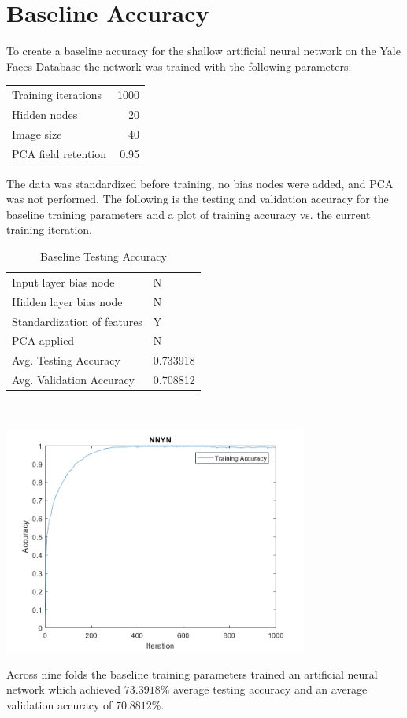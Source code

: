 \documentclass[12pt]{article}
\newcommand{\testingValidationAccuracyTable}[7] {
  \begin{tabular}{l|l}
    \hline
    Input layer bias node & #1 \\
    Hidden layer bias node & #2 \\
    Standardization of features & #3 \\
    PCA applied & #4 \\
    \hline
    Avg. Testing Accuracy & #5 \\
    Avg. Validation Accuracy & #6 \\
    \hline
  \end{tabular}
  ~\\[60pt]
  \caption{#7}
}
\begin{document}
\section{Baseline Accuracy}
To create a baseline accuracy for the shallow artificial neural network on the Yale Faces Database the network was trained with the following parameters:
\begin{center}
  \begin{tabular}{l|r}
    \hline
    Training iterations & 1000 \\
    Hidden nodes & 20 \\
    Image size & 40 \\
    PCA field retention & 0.95 \\
    \hline
  \end{tabular}
\end{center}
\bigskip

The data was standardized before training, no bias nodes were added, and PCA was not performed. The following is the testing and validation accuracy for the baseline training parameters and a plot of training accuracy vs. the current training iteration.\\
\begin{center}
  \begin{table}[H]
    \begin{varwidth}[b]{0.4\linewidth}
      \centering
      \testingValidationAccuracyTable{N}{N}{Y}{N}{0.733918}{0.708812}{Baseline Testing Accuracy}
      \label{table:baseline}
    \end{varwidth}%
    \hfill
    \begin{minipage}[b]{0.6\linewidth}
      \centering
      \includegraphics[width=100mm]{accuracy_imgs/baseline_training_accuracy.png}
      \label{fig:baseline_img}
    \end{minipage}
  \end{table}
\end{center}
Across nine folds the baseline training parameters trained an artificial neural network which achieved $73.3918\%$ average testing accuracy and an average validation accuracy of $70.8812\%$.
\end{document}
